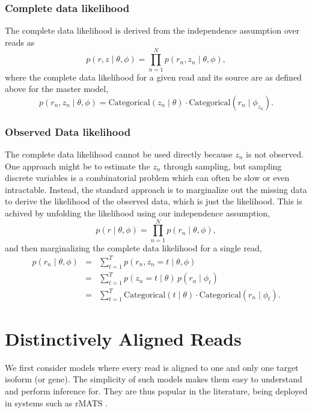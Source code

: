 \documentclass[11pt]{report}
\begin{document}
\subsection{Complete data likelihood}

The complete data likelihood is derived from the independence
assumption over reads as
\[
  p(r, z \mid \theta, \phi)
  = \prod_{n=1}^N p(r_n, z_n \mid \theta, \phi),
\]
where the complete data likelihood for a given read and its source are
as defined above for the master model,
\[
  p(r_n, z_n \mid \theta, \phi)
  = \textrm{Categorical}(z_n \mid \theta)
  \cdot \textrm{Categorical}(r_n \mid \phi_{z_n}).
\]

\subsection{Observed Data likelihood}

The complete data likelihood cannot be used directly because $z_n$ is
not observed.  One approach might be to estimate the $z_n$ through
sampling, but sampling discrete variables is a combinatorial problem
which can often be slow or even intractable.  Instead, the standard
approach is to marginalize out the missing data to derive the
likelihood of the observed data, which is just the likelihood.  This
is achived by unfolding the likelihood using our independence
assumption,
\[
  p(r \mid \theta, \phi)
  = \prod_{n=1}^N p(r_n \mid \theta, \phi),
\]
and then marginalizing the complete data likelihood for a single read,
\begin{eqnarray*}
  p(r_n \mid \theta, \phi)
  & = & \textstyle \sum_{t=1}^T p(r_n, z_n = t \mid \theta, \phi)
  \\[4pt]
  & = & \textstyle \sum_{t=1}^T p(z_n = t \mid \theta) \, p(r_n \mid \phi_t)
  \\[4pt]
  & = & \textstyle \sum_{t=1}^T \textrm{Categorical}(t \mid \theta)
        \cdot \textrm{Categorical}(r_n \mid \phi_t).
\end{eqnarray*}
  
\chapter{Distinctively Aligned Reads}

We first consider models where every read is aligned to one and only
one target isoform (or gene). The simplicity of such models makes them
easy to understand and perform inference for. They are thus popular in
the literature, being deployed in systems such as rMATS
\citep{shen2014rmats}.
\end{document}
